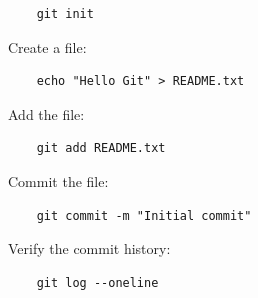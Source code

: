 \begin{lstlisting} 
    git init 
\end{lstlisting} 

Create a file: 

\begin{lstlisting} 
    echo "Hello Git" > README.txt 
\end{lstlisting} 

Add the file: 

\begin{lstlisting} 
    git add README.txt 
\end{lstlisting} 

Commit the file: 

\begin{lstlisting} 
    git commit -m "Initial commit" 
\end{lstlisting} 

Verify the commit history: 

\begin{lstlisting} 
    git log --oneline 
\end{lstlisting}